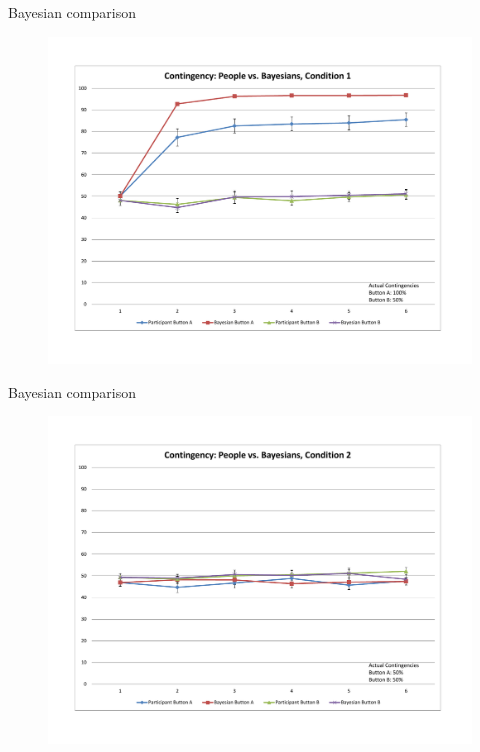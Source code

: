 \documentclass{beamer}
\begin{document}
\begin{frame}{Bayesian comparison}
	\begin{figure}
	\begin{center}
		\includegraphics[width=\linewidth]{learning1}
	\end{center}
	\end{figure}
\end{frame}


\begin{frame}{Bayesian comparison}
	\begin{figure}
	\begin{center}
		\includegraphics[width=\linewidth]{learning2}
	\end{center}
	\end{figure}
\end{frame}
\end{document}
